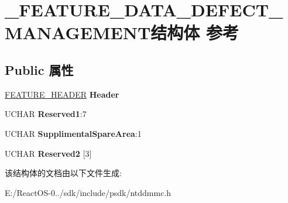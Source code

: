 \hypertarget{struct___f_e_a_t_u_r_e___d_a_t_a___d_e_f_e_c_t___m_a_n_a_g_e_m_e_n_t}{}\section{\+\_\+\+F\+E\+A\+T\+U\+R\+E\+\_\+\+D\+A\+T\+A\+\_\+\+D\+E\+F\+E\+C\+T\+\_\+\+M\+A\+N\+A\+G\+E\+M\+E\+N\+T结构体 参考}
\label{struct___f_e_a_t_u_r_e___d_a_t_a___d_e_f_e_c_t___m_a_n_a_g_e_m_e_n_t}
\subsection*{Public 属性}
\begin{DoxyCompactItemize}
\item 
\mbox{\label{struct___f_e_a_t_u_r_e___d_a_t_a___d_e_f_e_c_t___m_a_n_a_g_e_m_e_n_t_a0876e1d3bfff649d5a45af35cf060101}} 
\hyperlink{struct___f_e_a_t_u_r_e___h_e_a_d_e_r}{F\+E\+A\+T\+U\+R\+E\+\_\+\+H\+E\+A\+D\+ER} {\bfseries Header}
\item 
\mbox{\label{struct___f_e_a_t_u_r_e___d_a_t_a___d_e_f_e_c_t___m_a_n_a_g_e_m_e_n_t_a1c396cfeee3974e1c7706b70267511d1}} 
U\+C\+H\+AR {\bfseries Reserved1}\+:7
\item 
\mbox{\label{struct___f_e_a_t_u_r_e___d_a_t_a___d_e_f_e_c_t___m_a_n_a_g_e_m_e_n_t_a3e51263525ea30f527ee49eb8d1ef7d1}} 
U\+C\+H\+AR {\bfseries Supplimental\+Spare\+Area}\+:1
\item 
\mbox{\label{struct___f_e_a_t_u_r_e___d_a_t_a___d_e_f_e_c_t___m_a_n_a_g_e_m_e_n_t_a2d00785dc4625120735242d8d001bbdf}} 
U\+C\+H\+AR {\bfseries Reserved2} \mbox{[}3\mbox{]}
\end{DoxyCompactItemize}


该结构体的文档由以下文件生成\+:\begin{DoxyCompactItemize}
\item 
E\+:/\+React\+O\+S-\/0../sdk/include/psdk/ntddmmc.\+h\end{DoxyCompactItemize}
